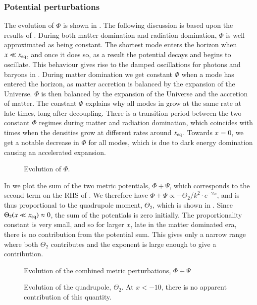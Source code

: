 \subsubsection{Potential perturbations} \label{sssec:M3:results:metric_perturbations}
The evolution of $\Phi$ is shown in . The following discussion is based upon the results of \cite[Ch. 8]{Dodelson}. During both matter domination and radiation domination, $\Phi$ is well approximated as being constant. The shortest mode enters the horizon when $x\ll x_\mathrm{eq}$, and once it does so, as a result the potential decays and begins to oscillate. This behaviour gives rise to the damped oscillations for photons and baryons in . During matter domination we get constant $\Phi$ when a mode has entered the horizon, as matter accretion is balanced by the expansion of the Universe. $\Phi$ is then balanced by the expansion of the Universe and the accretion of matter. The constant $\Phi$ explains why all modes in  grow at the same rate at late times, long after decoupling. There is a transition period between the two constant $\Phi$ regimes during matter and radiation domination, which coincides with times when the densities grow at different rates around $x_\mathrm{eq}$. Towards $x=0$, we get a notable decrease in $\Phi$ for all modes, which is due to dark energy domination causing an accelerated expansion. 


\begin{figure}[ht!]
    \caption{Evolution of $\Phi$.}
    \label{fig:M3:results:Phi}
\end{figure}

In  we plot the sum of the two metric potentials, $\Phi+\Psi$, which corresponds to the second term on the RHS of . We therefore have $\Phi+\Psi \propto -\Theta_2 / k^2 \cdot e^{-2x}$, and is thus proportional to the quadrupole moment, $\Theta_2$, which is shown in . Since $\Theta_2(x\ll x_\mathrm{eq})\approx 0$, the sum of the potentials is zero initially. The proportionality constant is very small, and so for larger $x$, late in the matter dominated era, there is no contribution from the potential sum. This gives only a narrow range where both $\Theta_2$ contributes and the exponent is large enough to give a contribution.    
\begin{figure}[ht!]
    \caption{Evolution of the combined metric perturbations, $\Phi+\Psi$}
    \label{fig:M3:results:Phi_plus_Psi}
\end{figure}

  
\begin{figure}[ht!]
    \caption{Evolution of the quadrupole, $\Theta_2$. At $x<-10$, there is no apparent contribution of this quantity.}
    \label{fig:M3:results:Theta2}
\end{figure}
